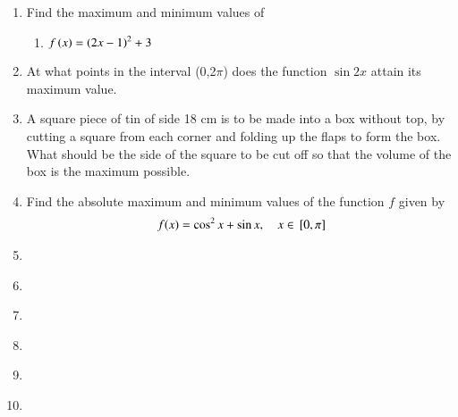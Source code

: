 \begin{enumerate}[label=\thesection.\arabic*,ref=\thesection.\theenumi]
\item
Find the maximum and minimum values of  
	\begin{enumerate}
\item $f\left(x\right) = \left(2x-1\right)^2 + 3$ 
\solution 
\label{12/6/5/1/1/2}

	\end{enumerate}
\item
At what points in the interval (0,2$\pi$) does the function $\sin2x$ attain its maximum value.
\label{12/6/5/8/1}
%
\item A square piece of tin of side 18 cm is to be made into a box without top, by cutting a square from each corner and folding up the flaps to form the box. What should be the side of the square to be cut off so that the volume of the box is the maximum possible.\\
	\solution

\item
Find the absolute maximum and minimum values of the function $f$ given by 
\begin{align}
	f(x) = \cos^2x + \sin x,\quad x \in {}\left[0,\pi\right] 
\end{align} 
\label{12/6/6/14/1}
%

\item
\label{12/6/5/6}

\item
\label{12/6/5/7}

\item
\label{12/6/5/8}

\item
\label{12/6/5/10}

\item
\label{12/6/5/11}

\item
\label{12/6/6/14}


\end{enumerate}

